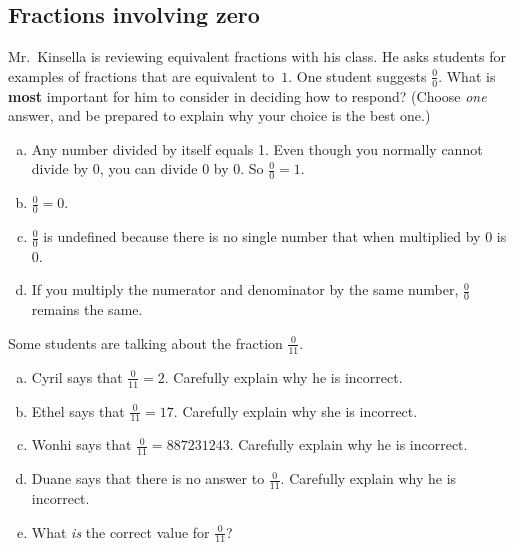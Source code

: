 \subsection{Fractions involving zero}

\begin{thinkpair*}
Mr.~Kinsella is reviewing equivalent fractions with his class.  He asks students for examples of fractions that are equivalent to~$1$.  One student suggests $\frac{0}{0}$.  What is {\bf most} important for him to consider in deciding how to respond?  (Choose \emph{one} answer, and be prepared to explain why your choice is the best one.)

\begin{enumerate}[(a)]
\item
Any number divided by itself equals 1.  Even though you normally cannot divide by 0, you can divide 0 by 0.  So $\frac 0 0 = 1$.\\

\item
$\frac 0 0 = 0 $.\\

\item
$\frac 0 0 $ is undefined because there is no single number that when multiplied by 0 is 0.\\

\item
If you multiply the numerator and denominator by the same number, $\frac 0 0 $ remains the same.

\end{enumerate}

\end{thinkpair*}



\begin{thinkpair*}
Some students are talking about the fraction $\frac 0{11}$.
\begin{enumerate}[(a)]
\item
Cyril says that $\frac 0{11} = 2$.  Carefully explain why he is incorrect.\\

\item
Ethel says that $\frac 0{11} = 17$.  Carefully explain why she is incorrect.\\

\item
Wonhi says that $\frac 0{11} = 887231243$.  Carefully explain why he is incorrect.\\

\item
Duane says that there is no answer to $\frac 0{11}$.  Carefully explain why he is incorrect.\\

\item
What \emph{is} the correct value for $\frac 0{11}$?
\end{enumerate}
\end{thinkpair*}



